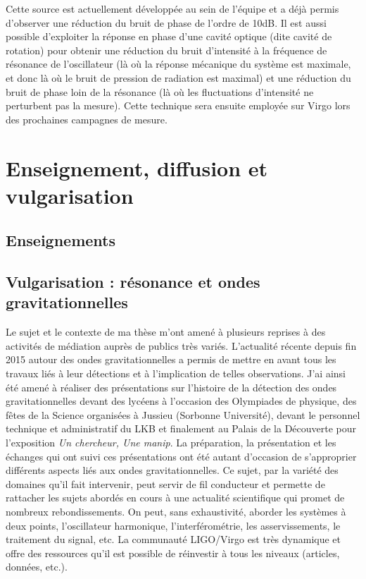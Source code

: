 \documentclass[12pt,a4paper]{article}
\begin{document}
Cette source est actuellement développée au sein de l'équipe et a déjà permis d'observer une réduction du bruit de phase de l'ordre de \unit{10}{dB}.
Il est aussi possible d'exploiter la réponse en phase d'une cavité optique (dite cavité de rotation) pour obtenir une réduction du bruit d'intensité à la fréquence de résonance de l'oscillateur (là où la réponse mécanique du système est maximale, et donc là où le bruit de pression de radiation est maximal) et une réduction du bruit de phase loin de la résonance (là où les fluctuations d'intensité ne perturbent pas la mesure).
Cette technique sera ensuite employée sur Virgo lors des prochaines campagnes de mesure.

\section{Enseignement, diffusion et vulgarisation}

\subsection{Enseignements}

\subsection{Vulgarisation : résonance et ondes gravitationnelles}

Le sujet et le contexte de ma thèse m'ont amené à plusieurs reprises à des activités de médiation auprès de publics très variés.
L'actualité récente depuis fin 2015 autour des ondes gravitationnelles a permis de mettre en avant tous les travaux liés à leur détections et à l'implication de telles observations.
J'ai ainsi été amené à réaliser des présentations sur l'histoire de la détection des ondes gravitationnelles devant des lycéens à l'occasion des Olympiades de physique, des fêtes de la Science organisées à Jussieu (Sorbonne Université), devant le personnel technique et administratif du LKB et finalement au Palais de la Découverte pour l'exposition \textit{Un chercheur, Une manip}.
La préparation, la présentation et les échanges qui ont suivi ces présentations ont été autant d'occasion de s'approprier différents aspects liés aux ondes gravitationnelles.
Ce sujet, par la variété des domaines qu'il fait intervenir, peut servir de fil conducteur et permette de rattacher les sujets abordés en cours à une actualité scientifique  qui promet de nombreux rebondissements.
On peut, sans exhaustivité, aborder les systèmes à deux points, l'oscillateur harmonique, l'interférométrie, les asservissements, le traitement du signal, etc.
La communauté LIGO/Virgo est très dynamique et offre des ressources qu'il est possible de réinvestir à tous les niveaux (articles, données, etc.).
\end{document}
